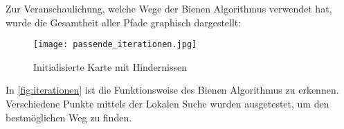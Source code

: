 Zur Veranschaulichung, welche Wege der Bienen Algorithmus verwendet hat, wurde die Gesamtheit aller Pfade graphisch dargestellt:
\begin{figure}[H]
    \centering
    \texttt{[image: passende\_iterationen.jpg]}
    \caption{Initialisierte Karte mit Hindernissen\\}   
    \label{fig:iterationen}
\end{figure}

In \autoref{fig:iterationen} ist die Funktionsweise des Bienen Algorithmus zu erkennen. Verschiedene Punkte mittels der Lokalen Suche wurden ausgetestet, um den bestmöglichen Weg zu finden.